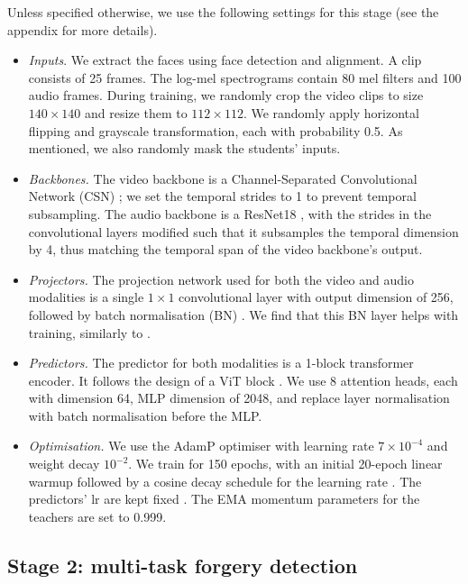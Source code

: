 \documentclass[10pt,twocolumn,letterpaper]{article}
\begin{document}
\begin{description}[wide,itemindent=\labelsep]
\item[Implementation details.] Unless specified otherwise, we use the following settings for this stage (see the appendix for more details).
\begin{itemize}[leftmargin=*]
    \item \textit{Inputs}. We extract the faces using face detection and alignment. A clip consists of 25 frames. The log-mel spectrograms contain 80 mel filters and 100 audio frames. During training, we randomly crop the video clips to size $140\times 140$ and resize them to $112\times 112$. We randomly apply horizontal flipping and grayscale transformation, each with probability 0.5. As mentioned, we also randomly mask the students' inputs.
    \item \textit{Backbones.} The video backbone is a Channel-Separated Convolutional Network (CSN) \cite{tran2019video}; we set the temporal strides to 1 to prevent temporal subsampling. The audio backbone is a ResNet18 \cite{he2016deep}, with the strides in the convolutional layers modified such that it subsamples the temporal dimension by 4, thus matching the temporal span of the video backbone's output.
    \item \textit{Projectors.} The projection network used for both the video and audio modalities is a single $1\times 1$ convolutional layer with output dimension of 256, followed by batch normalisation (BN) \cite{ioffe2015batch}.  We find that this BN layer helps with training, similarly to \cite{chen2021exploring}.
    \item \textit{Predictors.} The predictor for both modalities is a 1-block transformer encoder. It follows the design of a ViT block \cite{dosovitskiy2020image}. We use 8 attention heads, each with dimension 64, MLP dimension of 2048, and replace layer normalisation \cite{ba2016layer} with batch normalisation \cite{ioffe2015batch} before the MLP.
    \item \textit{Optimisation.} We use the AdamP optimiser \cite{heo2020adamp} with learning rate $7\times 10^{-4}$ and weight decay $10^{-2}$. We train for 150 epochs, with an initial 20-epoch linear warmup followed by a cosine decay schedule for the learning rate \cite{loshchilov2016sgdr}. The predictors' lr are kept fixed \cite{chen2021exploring}. The EMA momentum parameters for the teachers are set to 0.999.
\end{itemize}


\end{description}

\subsection{Stage 2: multi-task forgery detection}
\end{document}
